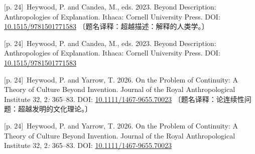 \documentclass[10pt,a4paper]{article}
\begin{document}
\noindent\begin{minipage}{\textwidth}\begin{minipage}[t]{\dimexpr.5\textwidth-4mm\relax}\noindent\begin{minipage}[t]{\linewidth}{\scriptsize\color{gray} [p. 24]}\ Heywood, P. and Candea, M., eds. 2023. Beyond Description: Anthropologies of Explanation. Ithaca: Cornell University Press. DOI: \url{10.1515/9781501771583} 〔题名译释：超越描述：解释的人类学。〕\par\end{minipage}\par\end{minipage}\hfill\begin{minipage}[t]{\dimexpr.5\textwidth-4mm\relax}\noindent\begin{minipage}[t]{\linewidth}{\scriptsize\color{gray} [p. 24]}\ Heywood, P. and Candea, M., eds. 2023. Beyond Description: Anthropologies of Explanation. Ithaca: Cornell University Press. DOI: \url{10.1515/9781501771583}\par\end{minipage}\par\end{minipage}\end{minipage}\par
\noindent\begin{minipage}{\textwidth}\begin{minipage}[t]{\dimexpr.5\textwidth-4mm\relax}\noindent\begin{minipage}[t]{\linewidth}{\scriptsize\color{gray} [p. 24]}\ Heywood, P. and Yarrow, T. 2026. On the Problem of Continuity: A Theory of Culture Beyond Invention. Journal of the Royal Anthropological Institute 32, 2\textit{:} 365–83. DOI: \url{10.1111/1467-9655.70023} 〔题名译释：论连续性问题：超越发明的文化理论。〕\par\end{minipage}\par\end{minipage}\hfill\begin{minipage}[t]{\dimexpr.5\textwidth-4mm\relax}\noindent\begin{minipage}[t]{\linewidth}{\scriptsize\color{gray} [p. 24]}\ Heywood, P. and Yarrow, T. 2026. On the Problem of Continuity: A Theory of Culture Beyond Invention. Journal of the Royal Anthropological Institute 32, 2\textit{:} 365–83. DOI: \url{10.1111/1467-9655.70023}\par\end{minipage}\par\end{minipage}\end{minipage}\par
\end{document}
